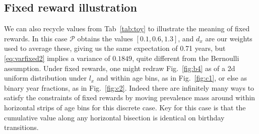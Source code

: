 \documentclass{bmcart}
\begin{document}
\subsection{Fixed reward illustration}
We can also recycle values from Tab~\ref{tab:toy} to illustrate the meaning of fixed rewards. In this case $\mathcal{P}$ obtains the values $[0.1,0.6,1.3]$, and $d_x$ are our weights used to average these, giving us the same expectation of 0.71 years, but \eqref{eq:varfixed2} implies a variance of $0.1849$, quite different from the Bernoulli assumption. Under fixed rewards, one might redraw Fig.~\ref{fig:b4} as of a 2d uniform distribution under $l_x$ and within age bins, as in Fig.~\ref{fig:c1}, or else as binary year fractions, as in Fig.~\ref{fig:c2}. Indeed there are infinitely many ways to satisfy the constraints of fixed rewards by moving prevalence mass around within horizontal strips of age bins for this discrete case. Key for this case is that the cumulative value along any horizontal bisection is identical on birthday transitions.
\end{document}
